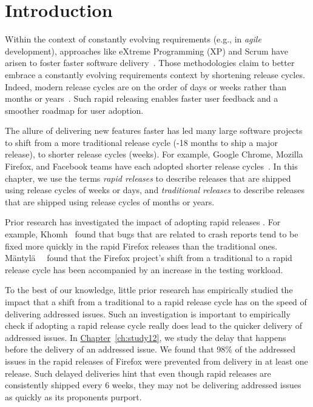\section{Introduction} \label{sec:introduction}

Within the context of constantly evolving requirements (e.g., in \textit{agile}
development), approaches like eXtreme Programming (XP) and Scrum have arisen to
foster faster software
delivery~\cite{beck2000extreme}.
Those methodologies claim to better embrace a constantly evolving requirements
context by shortening release cycles. Indeed, modern release cycles are on the
order of days or weeks rather than months or years~\cite{baskerville2004short}.
Such rapid releasing enables faster user feedback and a smoother roadmap for
user adoption.

The allure of delivering new features faster has led many large software
projects to shift from a more traditional release cycle (-18 months to
ship a major release), to shorter release cycles (\eg weeks). For example,
Google Chrome, Mozilla Firefox, and Facebook teams have each adopted shorter release
cycles~\cite{adams2016saner}. In this chapter, we use the terms \textit{rapid releases} to describe
releases that are shipped using release cycles of weeks or days, and \textit{traditional
releases} to describe releases that are shipped using release cycles of months or years. 

Prior research has investigated the impact of adopting rapid
releases \cite{mantyla2014rapid,souza2014rapid,souzabackout,baysal2011tale,khomh2012faster}.
For example, Khomh~\etal \cite{khomh2012faster} found that bugs that are related to crash
reports tend to be fixed more quickly in the rapid Firefox releases than the traditional
ones. M\"antyl\"a~\etal~\cite{mantyla2014rapid} found that the
Firefox project's shift from a traditional to a rapid release cycle has been
accompanied by an increase in the testing workload.

To the best of our knowledge, little prior research has empirically studied the
impact that a shift from a traditional to a rapid release cycle has on the speed
of delivering addressed issues. Such an investigation is important to
empirically check if adopting a rapid release cycle really does lead to the
quicker delivery of addressed issues. In
\hyperref[ch:study12]{Chapter}~\ref{ch:study12}, we study the delay that
happens before the delivery of an addressed issue. We found that 98\% of the
addressed issues in the rapid releases of Firefox were prevented from delivery
in at least one release. Such delayed deliveries hint that even though rapid
releases are consistently shipped every 6 weeks, they may not be delivering
addressed issues as quickly as its proponents purport.

